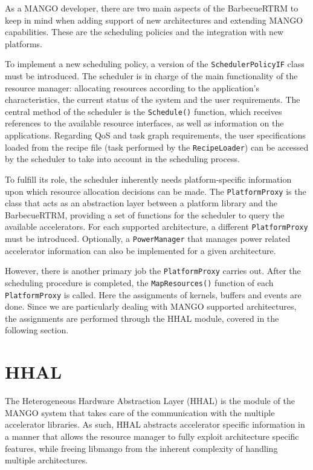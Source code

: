 As a MANGO developer, there are two main aspects of the BarbecueRTRM to keep in mind when adding support of new architectures and extending MANGO capabilities. These are the scheduling policies and the integration with new platforms.

To implement a new scheduling policy, a version of the \texttt{SchedulerPolicyIF} class must be introduced. The scheduler is in charge of the main functionality of the resource manager: allocating resources according to the application's characteristics, the current status of the system and the user requirements. 
The central method of the scheduler is the \texttt{Schedule()} function, which receives references to the available resource interfaces, as well as information on the applications.
Regarding QoS and task graph requirements, the user specifications loaded from the recipe file (task performed by the \texttt{RecipeLoader}) can be accessed by the scheduler to take into account in the scheduling process.

To fulfill its role, the scheduler inherently needs platform-specific information upon which resource allocation decisions can be made. The \texttt{PlatformProxy} is the class that acts as an abstraction layer between a platform library and the BarbecueRTRM, providing a set of functions for the scheduler to query the available accelerators. For each supported architecture, a different \texttt{PlatformProxy} must be introduced. Optionally, a \texttt{PowerManager} that manages power related accelerator information can also be implemented for a given architecture.

However, there is another primary job the \texttt{PlatformProxy} carries out. After the scheduling procedure is completed, the \texttt{MapResources()} function of each \texttt{PlatformProxy} is called. Here the assignments of kernels, buffers and events are done. Since we are particularly dealing with MANGO supported architectures, the assignments are performed through the HHAL module, covered in the following section.

\section{HHAL} \label{HHAL}


The Heterogeneous Hardware Abstraction Layer (HHAL) is the module of the MANGO system that takes care of the communication with the multiple accelerator libraries.
As such, HHAL abstracts accelerator specific information in a manner that allows the resource manager to fully exploit architecture specific features, while freeing libmango from the inherent complexity of handling multiple architectures.

